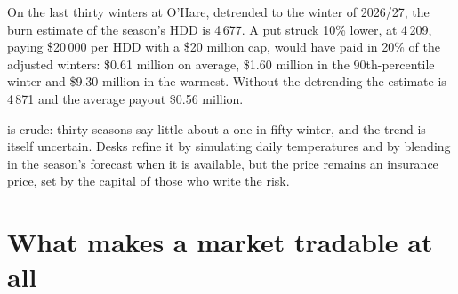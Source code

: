 \begin{example}\label{ex:m3:freight-weather-and-other-corners:put}
On the last thirty winters at O'Hare, detrended to the winter of 2026/27, the burn estimate of the
season's HDD is 4\,677. A put struck 10\% lower, at 4\,209, paying \$20\,000 per HDD with a
\$20 million cap, would have paid in 20\% of the adjusted winters: \$0.61 million on average, \$1.60
million in the 90th-percentile winter and \$9.30 million in the warmest. Without the detrending the
estimate is 4\,871 and the average payout \$0.56 million.
\end{example}

\begin{omfigure}

\label{fig:m3:freight-weather-and-other-corners:burn}
\end{omfigure}

 is crude: thirty seasons say little about a one-in-fifty winter, and the trend is itself
uncertain. Desks refine it by simulating daily temperatures and by blending in the season's forecast
when it is available, but the price remains an insurance price, set by the capital of those who write
the risk.

\section{What makes a market tradable at all}

